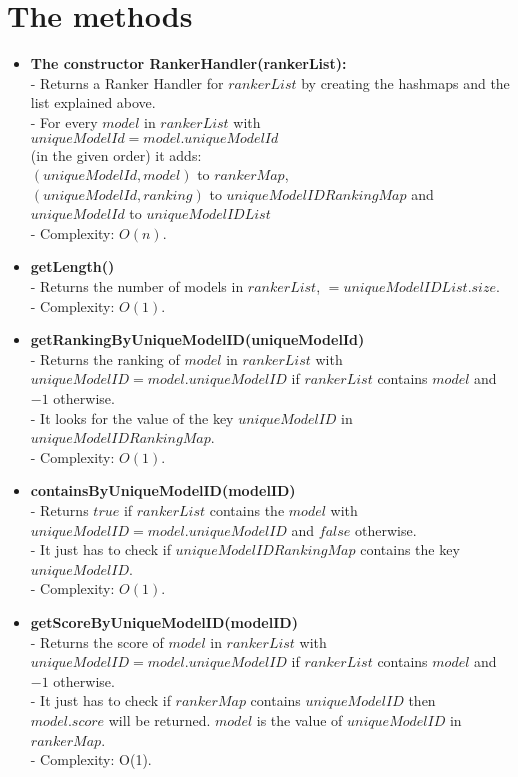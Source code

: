 \documentclass{article}
\begin{document}
	\section{The methods}
	
	\begin{itemize}
		\item \textbf{The constructor RankerHandler(rankerList):}\\
		- Returns a Ranker Handler for $rankerList$ by creating the hashmaps and the list explained above.\\
		- For every $model$ in $rankerList$ with $uniqueModelId = model.uniqueModelId$\\(in the given order) it adds:\\
		$(uniqueModelId, model)$ to $rankerMap$,\\
		$(uniqueModelId, ranking)$ to $uniqueModelIDRankingMap$ and
		$uniqueModelId$ to $uniqueModelIDList$\\
		- Complexity: $O(n)$.
		
		\item \textbf{getLength()}\\
		- Returns the number of models in $rankerList$, $= uniqueModelIDList.size$.\\
		- Complexity: $O(1)$.
		
		\item \textbf{getRankingByUniqueModelID(uniqueModelId)}\\	
		- Returns the ranking of $model$ in $rankerList$ with $uniqueModelID = model.uniqueModelID$ if $rankerList$ contains $model$ and $-1$ otherwise.\\
		- It looks for the value of the key $uniqueModelID$ in $uniqueModelIDRankingMap$.\\		
		- Complexity: $O(1)$.
		
		\item \textbf{containsByUniqueModelID(modelID)}\\
		- Returns $true$ if $rankerList$ contains the $model$ with $uniqueModelID = model.uniqueModelID$ and $false$ otherwise.\\
		- It just has to check if $uniqueModelIDRankingMap$ contains the key $uniqueModelID$.\\
		- Complexity: $O(1)$.
		
		\item \textbf{getScoreByUniqueModelID(modelID)}\\
		- Returns the score of $model$ in $rankerList$ with $uniqueModelID = model.uniqueModelID$ if $rankerList$ contains $model$ and $-1$ otherwise.\\
		- It just has to check if $rankerMap$ contains $uniqueModelID$ then $model.score$ will be returned. $model$ is the value of $uniqueModelID$ in  $rankerMap$.\\
		- Complexity: O(1).
		

\end{itemize}
\end{document}
